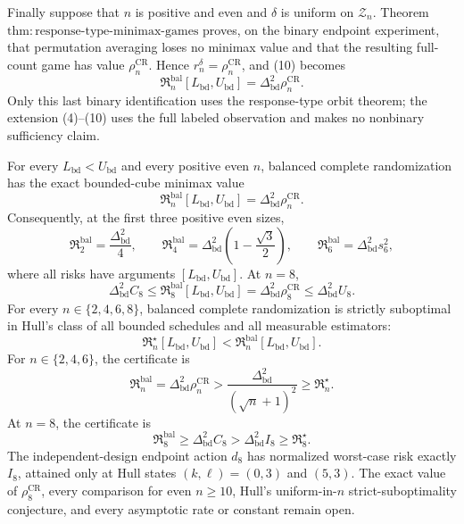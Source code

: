 Finally suppose that \(n\) is positive and even and \(\delta\) is uniform on \(\mathcal Z_n\).  Theorem \(\mathrm{thm{:}response\mbox{-}type\mbox{-}minimax\mbox{-}games}\) proves, on the binary endpoint experiment, that permutation averaging loses no minimax value and that the resulting full-count game has value \(\rho_n^{\mathrm{CR}}\).  Hence \(r_n^\delta=\rho_n^{\mathrm{CR}}\), and (10) becomes
\[
 \mathfrak R_n^{\mathrm{bal}}[L_{\mathrm{bd}},U_{\mathrm{bd}}]
 =\Delta_{\mathrm{bd}}^2\rho_n^{\mathrm{CR}}.
\]
Only this last binary identification uses the response-type orbit theorem; the extension (4)--(10) uses the full labeled observation and makes no nonbinary sufficiency claim.

For every \(L_{\mathrm{bd}}<U_{\mathrm{bd}}\) and every positive even \(n\), balanced complete randomization has the exact bounded-cube minimax value
\[
 \mathfrak R_n^{\mathrm{bal}}[L_{\mathrm{bd}},U_{\mathrm{bd}}]
 =\Delta_{\mathrm{bd}}^2\rho_n^{\mathrm{CR}}.
\]
Consequently, at the first three positive even sizes,
\[
 \mathfrak R_2^{\mathrm{bal}}=\frac{\Delta_{\mathrm{bd}}^2}{4},
 \qquad
 \mathfrak R_4^{\mathrm{bal}}
 =\Delta_{\mathrm{bd}}^2\left(1-\frac{\sqrt3}{2}\right),
 \qquad
 \mathfrak R_6^{\mathrm{bal}}=\Delta_{\mathrm{bd}}^2s_6^2,
\]
where all risks have arguments \([L_{\mathrm{bd}},U_{\mathrm{bd}}]\).  At \(n=8\),
\[
 \Delta_{\mathrm{bd}}^2C_8
 \leq\mathfrak R_8^{\mathrm{bal}}[L_{\mathrm{bd}},U_{\mathrm{bd}}]
 =\Delta_{\mathrm{bd}}^2\rho_8^{\mathrm{CR}}
 \leq\Delta_{\mathrm{bd}}^2U_8.
\]
For every \(n\in\{2,4,6,8\}\), balanced complete randomization is strictly suboptimal in Hull's class of all bounded schedules and all measurable estimators:
\[
 \mathfrak R_n^\star[L_{\mathrm{bd}},U_{\mathrm{bd}}]
 <\mathfrak R_n^{\mathrm{bal}}[L_{\mathrm{bd}},U_{\mathrm{bd}}].
\]
For \(n\in\{2,4,6\}\), the certificate is
\[
 \mathfrak R_n^{\mathrm{bal}}
 =\Delta_{\mathrm{bd}}^2\rho_n^{\mathrm{CR}}
 >\frac{\Delta_{\mathrm{bd}}^2}{(\sqrt n+1)^2}
 \geq\mathfrak R_n^\star.
\]
At \(n=8\), the certificate is
\[
 \mathfrak R_8^{\mathrm{bal}}
 \geq\Delta_{\mathrm{bd}}^2C_8
 >\Delta_{\mathrm{bd}}^2I_8
 \geq\mathfrak R_8^\star.
\]
The independent-design endpoint action \(d_8\) has normalized worst-case risk exactly \(I_8\), attained only at Hull states \((k,\ell)=(0,3)\) and \((5,3)\).  The exact value of \(\rho_8^{\mathrm{CR}}\), every comparison for even \(n\geq10\), Hull's uniform-in-\(n\) strict-suboptimality conjecture, and every asymptotic rate or constant remain open.

